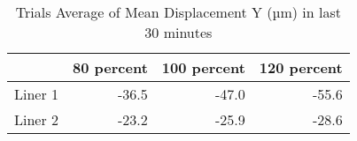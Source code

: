 \begin{table}[htbp]
\centering
\begin{tabular}{lrrr}
\toprule
  & 80 percent & 100 percent & 120 percent \\
\midrule
 Liner 1 & -36.5 & -47.0 & -55.6 \\
 Liner 2 & -23.2 & -25.9 & -28.6 \\
\bottomrule
\end{tabular}
\caption{Trials Average of Mean Displacement Y (µm) in last 30 minutes}
\label{fig:avg_results_table}
\end{table}